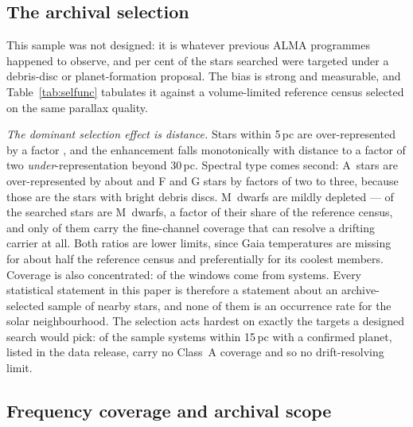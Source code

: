 \subsection{The archival selection}
\label{sec:bias}

This sample was not designed: it is whatever previous ALMA programmes
happened to observe, and \PctDiscProposal{} per cent of the stars searched
were targeted under a debris-disc or planet-formation proposal. The bias is
strong and measurable, and Table~\ref{tab:selfunc} tabulates it against a
volume-limited reference census selected on the same parallax quality.

\emph{The dominant selection effect is distance.} Stars within 5\,pc are
over-represented by a factor \SfTopRatio, and the enhancement falls
monotonically with distance to a factor of two \emph{under}-representation
beyond 30\,pc. Spectral type comes second: A~stars are over-represented by
about \SfARatio{} and F and G stars by factors of two to three, because those
are the stars with bright debris discs. M~dwarfs are mildly depleted ---
\SfMSearched{} of the \SfNStar{} searched stars are M~dwarfs, a factor
\SfMRatio{} of their share of the reference census, and only
\SfMClassAStars{} of them carry the fine-channel coverage that can resolve a
drifting carrier at all. Both ratios are lower limits, since Gaia
temperatures are missing for about half the reference census and
preferentially for its coolest members. Coverage is also concentrated:
\ConcThreeWin{} of the \NWindows{} windows come from \ConcThreeSys{}
systems. Every statistical statement in this paper is therefore a statement
about an archive-selected sample of nearby stars, and none of them is an
occurrence rate for the solar neighbourhood. The selection acts hardest on
exactly the targets a designed search would pick: of the \CsIntNRow{} sample
systems within 15\,pc with a confirmed planet, listed in the data release,
\CsIntNoClassA{} carry no Class~A coverage and so no drift-resolving limit.




\subsection{Frequency coverage and archival scope}
\label{sec:coverage}

